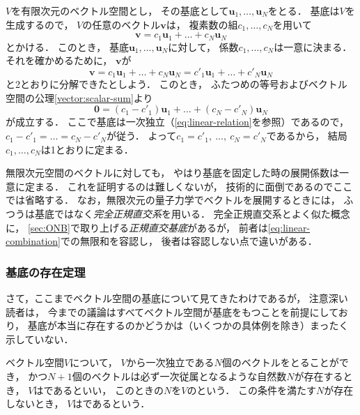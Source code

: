 \documentclass[
]{sotsu}
\begin{document}
$V$を有限次元のベクトル空間とし，
その基底として$\symbf{u}_1, \dots, \symbf{u}_N$をとる．
基底は$V$を生成するので，
$V$の任意のベクトル$\symbf{v}$は，
複素数の組$c_1, \dots, c_N$を用いて
\begin{equation*}
    \symbf{v} = c_1 \symbf{u}_1 + \dots + c_N \symbf{u}_N
\end{equation*}
とかける．
このとき，
基底$\symbf{u}_1, \dots, \symbf{u}_N$に対して，
係数$c_1, \dots, c_N$は一意に決まる．
それを確かめるために，
$\symbf{v}$が
\begin{equation*}
    \symbf{v} = c_1  \symbf{u}_1 + \dots + c_N  \symbf{u}_N
              = c'_1 \symbf{u}_1 + \dots + c'_N \symbf{u}_N
\end{equation*}
と2とおりに分解できたとしよう．
このとき，
ふたつめの等号およびベクトル空間の公理\cref{vector:scalar-sum}より
\begin{equation*}
    \symbf{0} = (c_1 - c'_1) \symbf{u}_1 + \dots + (c_N - c'_N) \symbf{u}_N
\end{equation*}
が成立する．
ここで基底は一次独立（\cref{eq:linear-relation}を参照）であるので，
$c_1 - c'_1 = \dots = c_N - c'_N$が従う．
よって$c_1 = c'_1, \  \dots, \  c_N = c'_N$であるから，
結局$c_1, \dots, c_N$は1とおりに定まる．

無限次元空間のベクトルに対しても，
やはり基底を固定した時の展開係数は一意に定まる．
これを証明するのは難しくないが，
技術的に面倒であるのでここでは省略する．
なお，無限次元の量子力学でベクトルを展開するときには，
ふつうは基底ではなく\emph{完全正規直交系}を用いる．
完全正規直交系とよく似た概念に，
\cref{sec:ONB}で取り上げる\emph{正規直交基底}があるが，
前者は\cref{eq:linear-combination}での無限和を容認し，
後者は容認しない点で違いがある．



\subsubsection{基底の存在定理}
\label{sec:existence-of-basis}

さて，ここまでベクトル空間の基底について見てきたわけであるが，
注意深い読者は，
今までの議論はすべてベクトル空間が基底をもつことを前提にしており，
基底が本当に存在するのかどうかは（いくつかの具体例を除き）まったく示していない．

ベクトル空間$V$について，
$V$から一次独立である$N$個のベクトルをとることができ，
かつ$N + 1$個のベクトルは必ず一次従属となるような自然数$N$が存在するとき，
$V$はであるといい，
このときの$N$を$V$のという．
この条件を満たす$N$が存在しないとき，
$V$はであるという．
\end{document}
